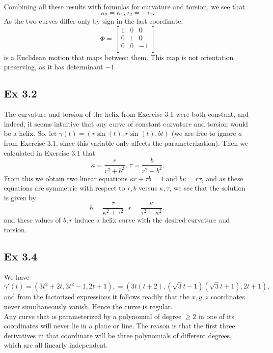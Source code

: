 \documentclass{article}
\theoremstyle{definition}
\begin{document}
Combining all these results with formulas for curvature and torsion, we see that 
\[
	\kappa_2 = \kappa_1, \tau_2 = -\tau_1.
\]
As the two curves differ only by sign in the last coordinate, 
\[
	\Phi 
	=
	\begin{bmatrix}
		1 & 0 & 0 \\	
		0 & 1 & 0 \\	
		0 & 0 & -1 \\	
	\end{bmatrix}
\] 
is a Euclidean motion that maps between them. This map is not orientation
preserving, as it has determinant $-1$.

\subsection*{Ex 3.2}

The curvature and torsion of the helix from Exercise 3.1 were both constant,
and indeed, it seems intuitive that any curve of constant curvature and torsion
would be a helix. So, let $\gamma(t) = (r \sin(t), r \sin(t), bt)$ (we are free
to ignore $a$ from Exercise 3.1, since this variable only affects the
parameterization). Then we calculated in Exercise 3.1 that
\[
	\kappa = \frac{r}{r^2 + b^2},\, 
	\tau = \frac{b}{r^2 + b^2}.
\] 
From this we obtain two linear equations $\kappa r + \tau b = 1$ and $b\kappa =
r\tau$, and as these equations are symmetric with respect to $r,b$ versus
$\kappa, \tau$, we see that the solution is given by
\[
	b = \frac{\tau}{\kappa^2 + \tau^2},\, 
	r = \frac{\kappa}{\tau^2 + \kappa^2}, 
\] 
and these values of $b, r$ induce a helix curve with the desired curvature and torsion.

\subsection*{Ex 3.4}

We have
\[
	\gamma'(t)
	=
	(3t^2 + 2t, 3t^2 - 1, 2t + 1),
	=
	(3t(t + 2), (\sqrt{3} t - 1)(\sqrt{3} t + 1), 2t + 1),
\] 
and from the factorized expressions it follows readily that the $x,y,z$
coordinates never simultaneously vanish. Hence the curve is regular. \\

Any curve that is parameterized by a polynomial of degree $\geq 2$ in one of
its coordinates will never lie in a plane or line. The reason is that the first
three derivatives in that coordinate will be three polynomials of different
degrees, which are all linearly independent.
\end{document}

